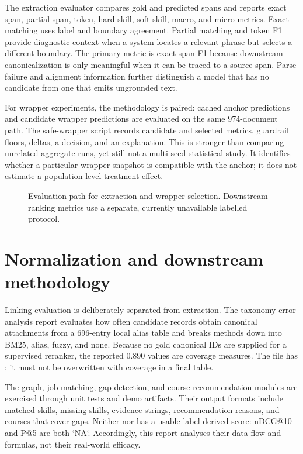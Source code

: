 The extraction evaluator compares gold and predicted spans and reports exact span, partial span, token, hard-skill, soft-skill, macro, and micro metrics. Exact matching uses label and boundary agreement. Partial matching and token F1 provide diagnostic context when a system locates a relevant phrase but selects a different boundary. The primary metric is exact-span F1 because downstream canonicalization is only meaningful when it can be traced to a source span. Parse failure and alignment information further distinguish a model that has no candidate from one that emits ungrounded text.

For wrapper experiments, the methodology is paired: cached anchor predictions and candidate wrapper predictions are evaluated on the same 974-document path. The safe-wrapper script records candidate and selected metrics, guardrail floors, deltas, a decision, and an explanation. This is stronger than comparing unrelated aggregate runs, yet still not a multi-seed statistical study. It identifies whether a particular wrapper snapshot is compatible with the anchor; it does not estimate a population-level treatment effect.

\begin{figure}[H]
\centering

\caption{Evaluation path for extraction and wrapper selection. Downstream ranking metrics use a separate, currently unavailable labelled protocol.}
\label{fig:evaluation}
\end{figure}

\section{Normalization and downstream methodology}

Linking evaluation is deliberately separated from extraction. The taxonomy error-analysis report evaluates how often candidate records obtain canonical attachments from a 696-entry local alias table and breaks methods down into BM25, alias, fuzzy, and none. Because no gold canonical IDs are supplied for a supervised reranker, the reported 0.890 values are coverage measures. The  file has ; it must not be overwritten with coverage in a final table.

The graph, job matching, gap detection, and course recommendation modules are exercised through unit tests and demo artifacts. Their output formats include matched skills, missing skills, evidence strings, recommendation reasons, and courses that cover gaps. Neither  nor  has a usable label-derived score: nDCG@10 and P@5 are both `NA`. Accordingly, this report analyses their data flow and formulas, not their real-world efficacy.

